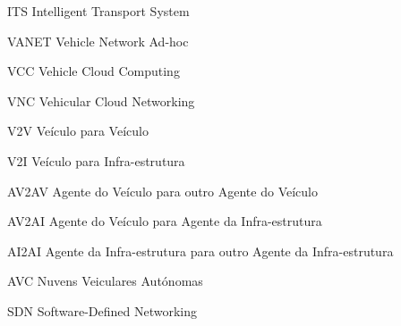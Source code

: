\documentclass[
	12pt,				%
	oneside,			%
	a4paper,			%
	english,			%
	brazil				%
	]{abntex2ppgsi}
\begin{document}
\listofalgorithms
\cleardoublepage

\listoftables*
\cleardoublepage

%
%
\begin{siglas}
	\item[ITS] Intelligent Transport System
	\item[VANET] Vehicle Network Ad-hoc
	\item[VCC] Vehicle Cloud Computing
	\item[VNC] Vehicular Cloud Networking
	\item[V2V] Veículo para Veículo
	\item[V2I] Veículo para Infra-estrutura
	\item[AV2AV] Agente do Veículo para outro Agente do Veículo
	\item[AV2AI] Agente do Veículo para Agente da Infra-estrutura
	\item[AI2AI] Agente da Infra-estrutura para outro Agente da Infra-estrutura
	\item[AVC] Nuvens Veiculares Autónomas
	\item[SDN] Software-Defined Networking

\end{siglas}
\end{document}
